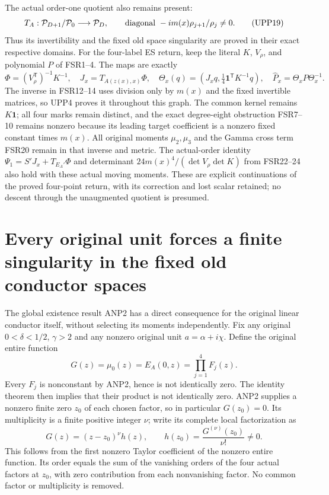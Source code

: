 \documentclass[11pt]{article}
\begin{document}
The actual order-one quotient also remains present:
\[
 T_A:\mathcal P_{D+1}/\mathcal P_0\longrightarrow\mathcal P_D,
 \qquad \hbox{diagonal }-im(x)\rho_{j+1}/\rho_j\ne0.
 \tag{UPP19}
\]
Thus its invertibility and the fixed old space singularity are proved
in their exact respective domains. For the four-label ES return, keep
the literal $K$, $V_\rho$, and polynomial $P$ of FSR1--4. The maps
are exactly
\[
 \Phi=(V_\rho^{\mathsf T})^{-1}K^{-1},\quad
 J_x=T_{A(z(x),x)}\Phi,\quad
 \Theta_x(q)=(J_xq,\tfrac14\mathbf1^{\mathsf T}K^{-1}q),\quad
 \widehat P_x=\Theta_xP\Theta_x^{-1}.
 \tag{UPP20}
\]
The inverse in FSR12--14 uses division only by $m(x)$ and the
fixed invertible matrices, so UPP4 proves it throughout this graph.
The common kernel remains $K\mathbf1$; all four marks remain
distinct, and the exact degree-eight obstruction FSR7--10 remains
nonzero because its leading target coefficient is a nonzero fixed
constant times $m(x)$. All original moments $\mu_2,\mu_3$ and the
Gamma cross term FSR20 remain in that inverse and metric. The
actual-order identity $\Psi_1=S'J_x+T_{E_A'}\Phi$ and determinant
$24m(x)^4/(\det V_\rho\det K)$ from FSR22--24 also hold with
these actual moving moments. These are explicit continuations of
the proved four-point return, with its correction and lost scalar
retained; no descent through the unaugmented quotient is presumed.

\section{Every original unit forces a finite singularity in the fixed old conductor spaces}
The global existence result ANP2 has a direct consequence for the original
linear conductor itself, without selecting its moments independently.
Fix any original $0<\delta<1/2$, $\gamma>2$ and any nonzero original
unit $a=\alpha+i\chi$. Define the original entire function
\[
 G(z)=\mu_0(z)=E_A(0,z)=\prod_{j=1}^4F_j(z).
 \tag{GUC1}
\]
Every $F_j$ is nonconstant by ANP2, hence is not identically zero.
The identity theorem then implies that their product is not identically
zero. ANP2 supplies a nonzero finite zero $z_0$ of each chosen factor,
so in particular $G(z_0)=0$. Its multiplicity is a finite positive
integer $\nu$; write its complete local factorization as
\[
 G(z)=(z-z_0)^\nu h(z),\qquad
 h(z_0)=\frac{G^{(\nu)}(z_0)}{\nu!}\ne0.
 \tag{GUC2}
\]
This follows from the first nonzero Taylor coefficient of the nonzero
entire function. Its order equals the sum of the vanishing orders of
the four actual factors at $z_0$, with zero contribution from each
nonvanishing factor. No common factor or multiplicity is removed.
\end{document}
